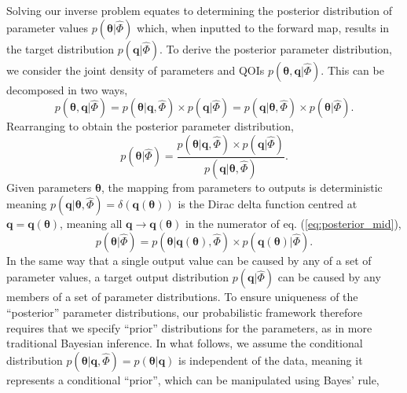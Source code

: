 Solving our inverse problem equates to determining the posterior distribution of parameter values $p(\boldsymbol{\theta}|\hat{\Phi})$  which, when inputted to the forward map, results in the target distribution $p(\boldsymbol{q}|\hat{\Phi})$. To derive the posterior parameter distribution, we consider the joint density of parameters and QOIs $p(\boldsymbol{\theta},\boldsymbol{q}|\hat{\Phi})$. This can be decomposed in two ways,
%
\begin{equation}\label{eq:joint}
  p( \boldsymbol{\theta}, \boldsymbol{q}|\hat{\Phi})
= p( \boldsymbol{\theta}|\boldsymbol{q}, \hat{\Phi}) \times p(\boldsymbol{q}|\hat{\Phi})
= p( \boldsymbol{q}|\boldsymbol{\theta}, \hat{\Phi} ) \times p(\boldsymbol{\theta}|\hat{\Phi}).
\end{equation}
%
Rearranging to obtain the posterior parameter distribution,
%
\begin{equation}\label{eq:posterior_mid}
p(\boldsymbol{\theta}|\hat{\Phi})
= \frac{p(\boldsymbol{\theta}|\boldsymbol{q}, \hat{\Phi}) \times p(\boldsymbol{q}|\hat{\Phi})}{p(\boldsymbol{q}| \boldsymbol{\theta}, \hat{\Phi})}.
\end{equation}
%
Given parameters $\boldsymbol{\theta}$, the mapping from parameters to outputs is deterministic meaning
$p(\boldsymbol{q}| \boldsymbol{\theta}, \hat{\Phi})=\delta(\boldsymbol{q}(\boldsymbol{\theta}))$ is the Dirac delta function centred at $\boldsymbol{q}=\boldsymbol{q}(\boldsymbol{\theta})$, meaning all $\boldsymbol{q}\rightarrow \boldsymbol{q}(\boldsymbol{\theta})$ in the numerator of eq. (\ref{eq:posterior_mid}),
%
\begin{equation}\label{eq:posterior_mid1}
p(\boldsymbol{\theta}|\hat{\Phi})
= p(\boldsymbol{\theta}|\boldsymbol{q}(\boldsymbol{\theta}), \hat{\Phi}) \times p(\boldsymbol{q}(\boldsymbol{\theta})|\hat{\Phi}).
\end{equation}
%
In the same way that a single output value can be caused by any of a set of parameter values, a target output distribution $p(\boldsymbol{q}|\hat{\Phi})$ can be caused by any members of a set of parameter distributions. To ensure uniqueness of the ``posterior'' parameter distributions, our probabilistic framework therefore requires that we specify ``prior'' distributions for the parameters, as in more traditional Bayesian inference. In what follows, we assume the conditional distribution $p(\boldsymbol{\theta}|\boldsymbol{q}, \hat{\Phi})=p(\boldsymbol{\theta}|\boldsymbol{q})$ is independent of the data, meaning it represents a conditional ``prior'', which can be manipulated using Bayes' rule,
